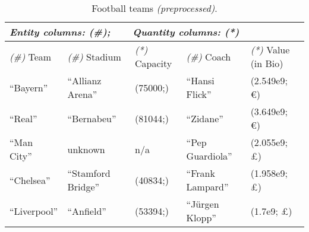 \begin{table}[t]
\centering
\caption{Football teams \textnormal{\textit{(preprocessed)}}.}
\label{table:ExampleTablePreprocessed}
\vspace{-1em}
\setlength{\tabcolsep}{0.34em}
{\footnotesize
\begin{tabular}{l|l|l|l|l}
\multicolumn{5}{l}{\textit{Entity columns: (\#);\ \ \ \ Quantity columns: (*)}}\\
\hline
\textit{(\#)} Team & \textit{(\#)} Stadium & \textit{(*)} Capacity & \textit{(\#)} Coach & \textit{(*)} Value (in Bio) \\ \hline
``Bayern'' & ``Allianz Arena'' & (75000;) & ``Hansi Flick'' &  (2.549e9; \euro) \\ 
``Real'' & ``Bernabeu'' & (81044;) & ``Zidane'' &  (3.649e9; \euro) \\ 
``Man City'' & unknown & n/a & ``Pep Guardiola'' & (2.055e9; \pounds) \\ 
``Chelsea'' & ``Stamford Bridge'' & (40834;) & ``Frank Lampard'' & (1.958e9; \pounds)  \\ 
``Liverpool'' & ``Anfield'' & (53394;) & ``J\"urgen Klopp'' & (1.7e9; \pounds)    \\ 
\hline

\end{tabular}
}
		
\end{table}